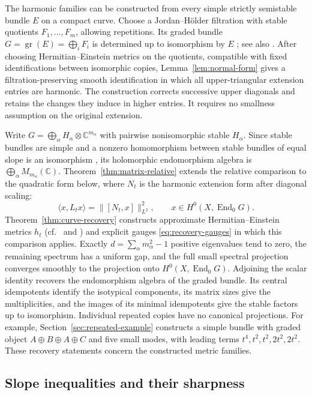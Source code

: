 \documentclass[11pt]{amsart}
\theoremstyle{definition}
\theoremstyle{remark}
\newcommand{\CC}{\mathbb C}
\newcommand{\End}{\operatorname{End}}
\begin{document}
The harmonic families can be constructed from every simple strictly
semistable bundle $E$ on a compact curve. Choose a Jordan--H\"older
filtration with stable quotients $F_1,\ldots,F_m$, allowing repetitions.
Its graded bundle
$G=\operatorname{gr}(E)=\bigoplus_iF_i$ is determined up to isomorphism
by $E$ \cite{Seshadri1967}; see also
\cite[Section~1.5]{HuybrechtsLehn2010}. After choosing
Hermitian--Einstein metrics on the quotients, compatible with fixed
identifications between isomorphic copies,
Lemma~\ref{lem:normal-form} gives a filtration-preserving smooth
identification in which all upper-triangular extension entries are
harmonic. The construction corrects successive upper diagonals and
retains the changes they induce in higher entries. It requires no
smallness assumption on the original extension.

Write $G=\bigoplus_\alpha H_\alpha\otimes\CC^{m_\alpha}$ with
pairwise nonisomorphic stable $H_\alpha$. Since stable bundles are
simple and a nonzero homomorphism between stable bundles of equal slope
is an isomorphism
\cite[Chapter~V, Proposition~7.11 and Corollaries~7.12, 7.14]{Kobayashi1987},
its holomorphic endomorphism algebra is
$\bigoplus_\alpha M_{m_\alpha}(\CC)$.
Theorem~\ref{thm:matrix-relative} extends the relative comparison
to the quadratic form below, where $N_t$ is the harmonic extension
form after diagonal scaling:
\[
 \langle x,L_tx\rangle=\lVert[N_t,x]\rVert_{L^2}^2,
 \qquad x\in H^0(X,\End_0G).
\]
Theorem~\ref{thm:curve-recovery} constructs approximate
Hermitian--Einstein metrics $h_t$
(cf.\ \cite[Chapter~VI, Theorem~10.13]{Kobayashi1987} and
\cite{Jacob2014}) and explicit gauges \eqref{eq:recovery-gauges} in which this comparison
applies. Exactly $d=\sum_\alpha m_\alpha^2-1$ positive
eigenvalues tend to zero, the remaining spectrum has a uniform gap,
and the full small spectral projection converges smoothly to the
projection onto $H^0(X,\End_0G)$. Adjoining the scalar identity
recovers the endomorphism algebra of the graded bundle. Its central
idempotents identify the isotypical components, its matrix sizes give
the multiplicities, and the images of its minimal idempotents give
the stable factors up to isomorphism. Individual repeated copies
have no canonical projections. For example, Section~\ref{sec:repeated-example}
constructs a simple bundle with graded object $A\oplus B\oplus A\oplus C$
and five small modes, with leading terms $t^4,t^2,t^2,2t^2,2t^2$.
These recovery statements concern the constructed metric families.

\subsection{Slope inequalities and their sharpness}
\end{document}
